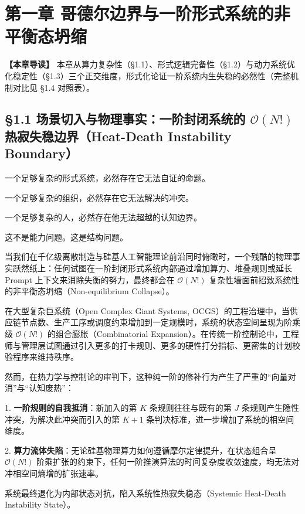 \documentclass[11pt,a4paper,oneside]{ctexart}
\begin{document}
\section{第一章 哥德尔边界与一阶形式系统的非平衡态坍缩}

\begin{notebox}
\textbf{【本章导读】} 本章从算力复杂性（§1.1）、形式逻辑完备性（§1.2）与动力系统优化稳定性（§1.3）三个正交维度，形式化论证一阶系统内生失稳的必然性（完整机制对比见 §1.4 对照表）。
\end{notebox}

\subsection{§1.1 场景切入与物理事实：一阶封闭系统的 $\mathcal{O}(N!)$ 热寂失稳边界（Heat-Death Instability Boundary）}

一个足够复杂的形式系统，必然存在它无法自证的命题。

一个足够复杂的组织，必然存在它无法解决的冲突。

一个足够复杂的人，必然存在他无法超越的认知边界。


这不是能力问题。这是结构问题。


当我们在千亿级离散制造与硅基人工智能理论前沿同时俯瞰时，一个残酷的物理事实跃然纸上：\textit{}任何试图在一阶封闭形式系统内部通过增加算力、堆叠规则或延长 Prompt 上下文来消除失衡的努力，最终都会在 $\mathcal{O}(N!)$ 复杂性墙面前招致系统性的非平衡态坍缩（Non-equilibrium Collapse）。\textit{}


在大型复杂巨系统（Open Complex Giant Systems, OCGS）的工程治理中，当供应链节点数、生产工序或调度约束增加到一定规模时，系统的状态空间呈现为阶乘级 $\mathcal{O}(N!)$ 的组合膨胀（Combinatorial Expansion）。在传统一阶控制论中，工程师与管理层试图通过引入更多的打卡规则、更多的硬性打分指标、更密集的计划校验程序来维持秩序。


然而，在热力学与控制论的审判下，这种纯一阶的修补行为产生了严重的“向量对消”与“认知废热”：

1. \textbf{一阶规则的自我抵消}：新加入的第 $K$ 条规则往往与既有的第 $J$ 条规则产生隐性冲突，为解决此冲突而引入的第 $K+1$ 条判决标准，进一步增加了系统的相空间维度。

2. \textbf{算力流体失陷}：无论硅基物理算力如何遵循摩尔定律提升，在状态组合呈 $\mathcal{O}(N!)$ 阶乘扩张的约束下，任何一阶推演算法的时间复杂度收敛速度，均无法对冲相空间熵增的扩张速率。


系统最终退化为内部状态对抗，陷入系统性热寂失稳态（Systemic Heat-Death Instability State）。
\end{document}
